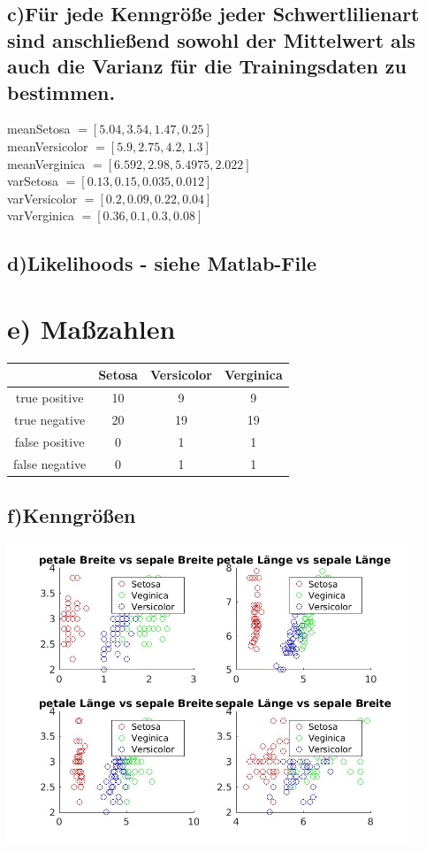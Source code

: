 \documentclass{scrartcl}
\begin{document}
\subsection*{c)Für jede Kenngröße jeder Schwertlilienart sind anschließend sowohl der Mittelwert als auch die Varianz	für die Trainingsdaten zu bestimmen.}
meanSetosa $ = [5.04, 3.54, 1.47, 0.25]$ \\
meanVersicolor  $ = [5.9, 2.75,	4.2, 1.3]$ \\
meanVerginica $ = [6.592, 2.98, 	5.4975, 2.022]$ \\ 

varSetosa $ = [0.13,	0.15,	0.035,	0.012]$ \\
varVersicolor $ = [0.2, 0.09, 0.22, 0.04]$\\
varVerginica $ = [0.36, 0.1, 0.3, 0.08]$ \\
\subsection*{d)Likelihoods - siehe Matlab-File}
\section*{e) Maßzahlen}
\begin{tabular}{|c|c|c|c|}
	\hline
	&	Setosa	&	Versicolor	&	Verginica\\ 
	\hline
	true positive  & 10	&9	&9\\
	true negative  & 20	&19	&19\\
	false positive & 0	&1	&1\\
	false negative & 0	&1	&1\\
	\hline
\end{tabular}

\subsection*{f)Kenngrößen}
\includegraphics[width=0.9\textwidth]{plots/plotF.jpg} \\ 
\end{document}
